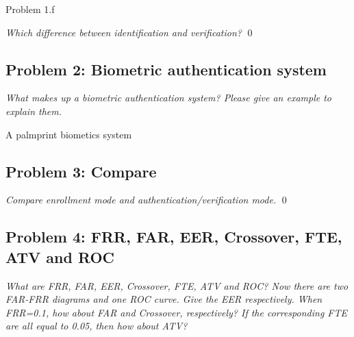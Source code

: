 \documentclass[
        ]{beamer}
\begin{document}
        
        
        \begin{frame}[c]{Problem 1.f}
    				\begin{overprint}
            \emph{Which difference between identification and verification?}
                \qed
            \end{overprint}            
        \end{frame}

    \subsection{Problem 2: Biometric authentication system}
        \begin{frame}[c]{\subsecname}
    				\begin{overprint}
            \emph{What makes up a biometric authentication system? Please give an example to explain them.}
            \end{overprint}   
        \end{frame}
        
        
        \begin{frame}[c]{A palmprint biometics system}
        \end{frame}

    \subsection{Problem 3: Compare}
        \begin{frame}[c]{\subsecname}
    				\begin{overprint}
            \emph{Compare enrollment mode and authentication/verification mode.}
                \qed
            \end{overprint}   
        \end{frame}

    \subsection{Problem 4: FRR, FAR, EER, Crossover, FTE, ATV and ROC}
        \begin{frame}[c]{\subsecname}
            \emph{What are FRR, FAR, EER, Crossover, FTE, ATV and ROC? Now there are two FAR-FRR diagrams and one ROC curve. Give the EER respectively. When FRR=0.1, how about FAR and Crossover, respectively? If the corresponding FTE are all equal to 0.05, then how about ATV? }
        \end{frame}
        
\end{document}
